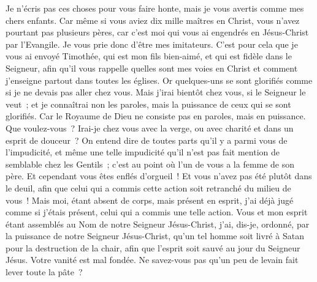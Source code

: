 \begin{multicols}{2}
Je n'écris pas ces choses pour vous faire honte, mais je vous avertis comme mes chers enfants.
Car même si vous aviez dix mille maîtres en Christ, vous n'avez pourtant pas plusieurs pères, car c'est moi qui vous ai engendrés en Jésus-Christ par l'Evangile.
Je vous prie donc d'être mes imitateurs.
C'est pour cela que je vous ai envoyé Timothée, qui est mon fils bien-aimé, et qui est fidèle dans le Seigneur, afin qu'il vous rappelle quelles sont mes voies en Christ et comment j'enseigne partout dans toutes les églises.
Or quelques-uns se sont glorifiés comme si je ne devais pas aller chez vous.
Mais j'irai bientôt chez vous, si le Seigneur le veut~; et je connaîtrai non les paroles, mais la puissance de ceux qui se sont glorifiés.
Car le Royaume de Dieu ne consiste pas en paroles, mais en puissance.
Que voulez-vous~? Irai-je chez vous avec la verge, ou avec charité et dans un esprit de douceur~?
\VerseOne{}On entend dire de toutes parts qu'il y a parmi vous de l'impudicité, et même une telle impudicité qu'il n'est pas fait mention de semblable chez les Gentils~; c'est au point où l'un de vous a la femme de son père.
Et cependant vous êtes enflés d'orgueil~! Et vous n'avez pas été plutôt dans le deuil, afin que celui qui a commis cette action soit retranché du milieu de vous~!
Mais moi, étant absent de corps, mais présent en esprit, j'ai déjà jugé comme si j'étais présent, celui qui a commis une telle action.
Vous et mon esprit étant assemblés au Nom de notre Seigneur Jésus-Christ, j'ai, dis-je, ordonné, par la puissance de notre Seigneur Jésus-Christ,
qu'un tel homme soit livré à Satan pour la destruction de la chair, afin que l'esprit soit sauvé au jour du Seigneur Jésus.
Votre vanité est mal fondée. Ne savez-vous pas qu'un peu de levain fait lever toute la pâte~?

\end{multicols}
